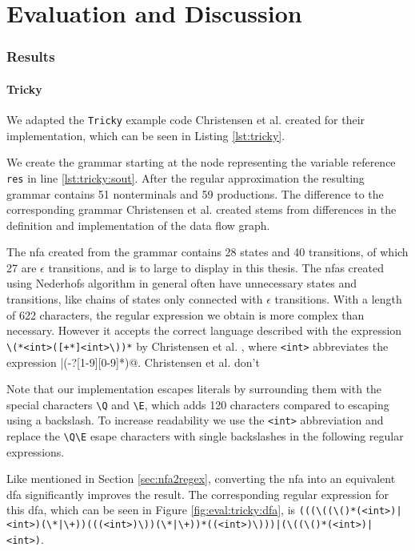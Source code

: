 \chapter{Evaluation and Discussion}
\label{chapter:Evaluation}

\subsection{Results}

\subsubsection{Tricky}

We adapted the \lstinline|Tricky| example code Christensen et al. created for their implementation, which can be seen in Listing \ref{lst:tricky}.

We create the grammar starting at the node representing the variable reference \lstinline|res| in line \ref{lst:tricky:sout}.
After the regular approximation the resulting grammar contains 51 nonterminals and 59 productions.
The difference to the corresponding grammar Christensen et al. created stems from differences in the definition and implementation of the data flow graph.


The \ac{nfa} created from the grammar contains 28 states and 40 transitions, of which 27 are $\epsilon$ transitions, and is to large to display in this thesis.
The \acp{nfa} created using Nederhofs algorithm in general often have unnecessary states and transitions, like chains of states only connected with $\epsilon$ transitions.
With a length of 622 characters, the regular expression we obtain is more complex than necessary. However it accepts the correct language described with the expression \lstinline|\(*<int>([+*]<int>\))*| by Christensen et al. \cite{brics}, where \lstinline|<int>| abbreviates the expression |(-?[1-9][0-9]*)@. Christensen et al. don't  

Note that our implementation escapes literals by surrounding them with the special characters \lstinline|\Q| and \lstinline|\E|, which adds 120 characters compared to escaping using a backslash.
To increase readability we use the \lstinline|<int>| abbreviation and replace the \lstinline|\Q\E| esape characters with single backslashes in the following regular expressions.

Like mentioned in Section \ref{sec:nfa2regex}, converting the \ac{nfa} into an equivalent \ac{dfa} significantly improves the result. The corresponding regular expression for this \ac{dfa}, which can be seen in Figure \ref{fig:eval:tricky:dfa}, is \lstinline[basicstyle=\small\ttfamily]@(((\((\()*(<int>)|<int>)(\*|\+))(((<int>)\))(\*|\+))*((<int>)\)))|(\((\()*(<int>)|<int>)@.

